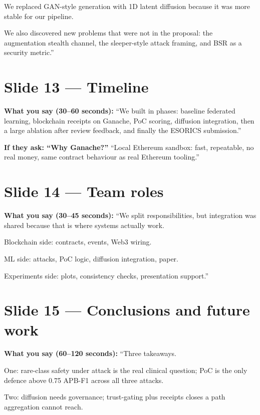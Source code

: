 \documentclass[11pt,a4paper]{article}
\begin{document}
\begin{itemize}
We replaced GAN-style generation with 1D latent diffusion because it was more stable for our pipeline.

We also discovered new problems that were not in the proposal: the augmentation stealth channel, the sleeper-style attack framing, and BSR as a security metric.''

\section{Slide 13 --- Timeline}

\textbf{What you say (30--60 seconds):}
``We built in phases: baseline federated learning, blockchain receipts on Ganache, PoC scoring, diffusion integration, then a large ablation after review feedback, and finally the ESORICS submission.''

\textbf{If they ask: ``Why Ganache?''}
``Local Ethereum sandbox: fast, repeatable, no real money, same contract behaviour as real Ethereum tooling.''

\section{Slide 14 --- Team roles}

\textbf{What you say (30--45 seconds):}
``We split responsibilities, but integration was shared because that is where systems actually work.

Blockchain side: contracts, events, Web3 wiring.

ML side: attacks, PoC logic, diffusion integration, paper.

Experiments side: plots, consistency checks, presentation support.''

\section{Slide 15 --- Conclusions and future work}

\textbf{What you say (60--120 seconds):}
``Three takeaways.

One: rare-class safety under attack is the real clinical question; PoC is the only defence above 0.75 APB-F1 across all three attacks.

Two: diffusion needs governance; trust-gating plus receipts closes a path aggregation cannot reach.


\end{itemize}
\end{document}
